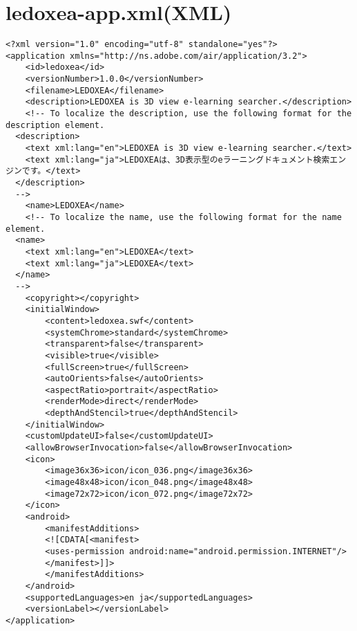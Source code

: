 \section{ledoxea-app.xml(XML)}
{\scriptsize
\begin{verbatim}
<?xml version="1.0" encoding="utf-8" standalone="yes"?>
<application xmlns="http://ns.adobe.com/air/application/3.2">
    <id>ledoxea</id>
    <versionNumber>1.0.0</versionNumber>
    <filename>LEDOXEA</filename>
    <description>LEDOXEA is 3D view e-learning searcher.</description>
    <!-- To localize the description, use the following format for the description element.
  <description>
    <text xml:lang="en">LEDOXEA is 3D view e-learning searcher.</text>
    <text xml:lang="ja">LEDOXEAは、3D表示型のeラーニングドキュメント検索エンジンです。</text>
  </description>
  -->
    <name>LEDOXEA</name>
    <!-- To localize the name, use the following format for the name element.
  <name>
    <text xml:lang="en">LEDOXEA</text>
    <text xml:lang="ja">LEDOXEA</text>
  </name>
  -->
    <copyright></copyright>
    <initialWindow>
        <content>ledoxea.swf</content>
        <systemChrome>standard</systemChrome>
        <transparent>false</transparent>
        <visible>true</visible>
        <fullScreen>true</fullScreen>
        <autoOrients>false</autoOrients>
        <aspectRatio>portrait</aspectRatio>
        <renderMode>direct</renderMode>
        <depthAndStencil>true</depthAndStencil>
    </initialWindow>
    <customUpdateUI>false</customUpdateUI>
    <allowBrowserInvocation>false</allowBrowserInvocation>
    <icon>
        <image36x36>icon/icon_036.png</image36x36>
        <image48x48>icon/icon_048.png</image48x48>
        <image72x72>icon/icon_072.png</image72x72>
    </icon>
    <android>
        <manifestAdditions>
		<![CDATA[<manifest>
		<uses-permission android:name="android.permission.INTERNET"/>
		</manifest>]]>
		</manifestAdditions>
    </android>
    <supportedLanguages>en ja</supportedLanguages>
    <versionLabel></versionLabel>
</application>
\end{verbatim}
 }
